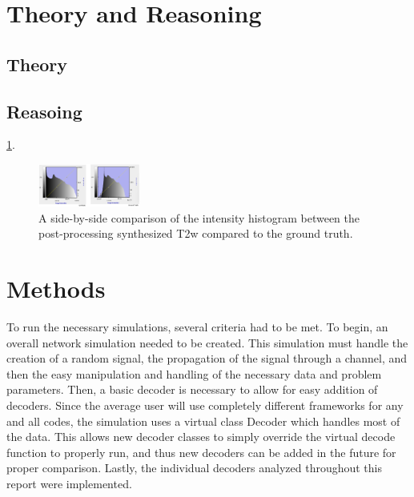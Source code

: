 \documentclass[conference]{IEEEtran}
\begin{document}
\section{Theory and Reasoning}
\subsection{Theory}
\lipsum[5]

\subsection{Reasoing}
\lipsum[6]
\ref{fig:example}.
\begin{figure}[h!]
    \centering
    \includegraphics[width=0.30\textwidth]{Histogram Comparison.png}
    \caption{A side-by-side comparison of the intensity histogram between the post-processing synthesized T2w compared to the ground truth.}
    \label{fig:example}
\end{figure}

\section{Methods}
To run the necessary simulations, several criteria had to be met. To begin, an overall network simulation needed to be created. This simulation must handle the creation of a random signal, the propagation of the signal through a channel, and then the easy manipulation and handling of the necessary data and problem parameters. Then, a basic decoder is necessary to allow for easy addition of decoders. Since the average user will use completely different frameworks for any and all codes, the simulation uses a virtual class Decoder which handles most of the data. This allows new decoder classes to simply override the virtual decode function to properly run, and thus new decoders can be added in the future for proper comparison. Lastly, the individual decoders analyzed throughout this report were implemented.
\end{document}
